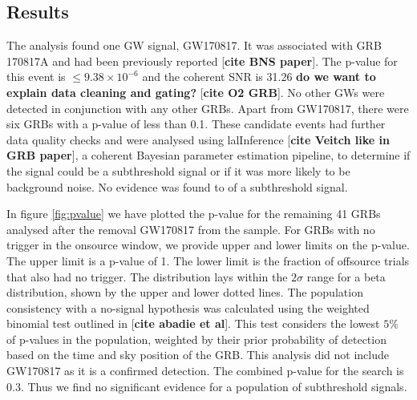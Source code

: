 \documentclass[11pt]{cuthesis}
\begin{document}
\subsection{Results}
The analysis found one GW signal, GW170817. It was associated with GRB 170817A and had been previously reported [\textbf{cite BNS paper}]. The p-value for this event is $\leq 9.38 \times 10^{-6}$ and the coherent SNR is 31.26 \textbf{do we want to explain data cleaning and gating?} [\textbf{cite O2 GRB}]. No other GWs were detected in conjunction with any other GRBs. Apart from GW170817, there were six GRBs with a p-value of less than 0.1. These candidate events had further data quality checks and were analysed using lalInference [\textbf{cite Veitch like in GRB paper}], a coherent Bayesian parameter estimation pipeline, to determine if the signal could be a subthreshold signal or if it was more likely to be background noise. No evidence was found to of a subthreshold signal. 

In figure \ref{fig:pvalue} we have plotted the p-value for the remaining 41 GRBs analysed after the removal GW170817 from the sample. For GRBs with no trigger in the onsource window, we provide upper and lower limits on the p-value. The upper limit is a p-value of 1. The lower limit is the fraction of offsource trials that also had no trigger. The distribution lays within the $2\sigma$ range for a beta distribution, shown by the upper and lower dotted lines. The population consistency with a no-signal hypothesis was calculated using the weighted binomial test outlined in [\textbf{cite abadie et al}]. This test considers the lowest $5\%$ of p-values in the population, weighted by their prior probability of detection based on the time and sky position of the GRB. This analysis did not include GW170817 as it is a confirmed detection. The combined p-value for the search is 0.3. Thus we find no significant evidence for a population of subthreshold signals.  
\end{document}
